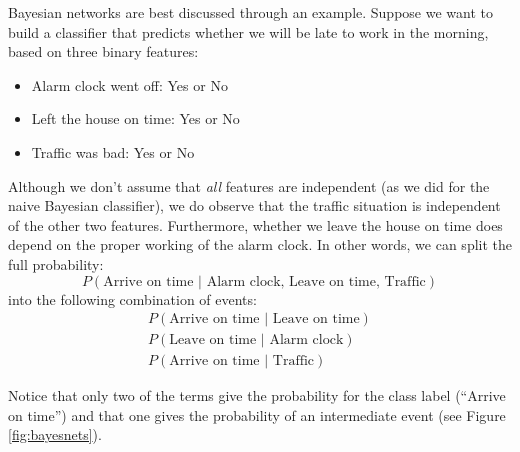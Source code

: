 Bayesian networks are best discussed through an example. Suppose we
want to build a classifier that predicts whether we will be late to
work in the morning, based on three binary features:

\begin{itemize}
\item Alarm clock went off: Yes or No
\item Left the house on time: Yes or No
\item Traffic was bad: Yes or No
\end{itemize}

Although we don't assume that \emph{all} features are independent (as
we did for the naive Bayesian classifier), we do observe
that the traffic situation is independent of the other two features.
Furthermore, whether we leave the house on time does depend on the
proper working of the alarm clock. In other words, we can split the
full probability:
%
\[
P( \text{Arrive on time } | 
   \text{ Alarm clock, Leave on time, Traffic} )
\]
%
into the following combination of events:
\begin{gather*}
P( \text{Arrive on time } | \text{ Leave on time} ) \\
P( \text{Leave on time } | \text{ Alarm clock} ) \\
P( \text{Arrive on time } | \text{ Traffic} )
\end{gather*}

Notice that only two of the terms give the probability for the class
label (``Arrive on time'') and that one gives the probability of an
intermediate event (see Figure \ref{fig:bayesnets}).

